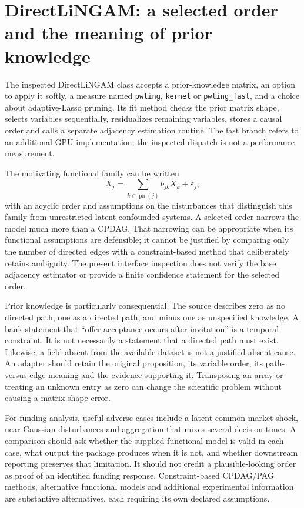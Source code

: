 \section{DirectLiNGAM: a selected order and the meaning of prior knowledge}

The inspected DirectLiNGAM class accepts a prior-knowledge matrix, an option to
apply it softly, a measure named \texttt{pwling}, \texttt{kernel} or
\texttt{pwling\_fast}, and a choice about adaptive-Lasso pruning. Its fit method
checks the prior matrix shape, selects variables sequentially, residualizes
remaining variables, stores a causal order and calls a separate adjacency
estimation routine. The fast branch refers to an additional GPU implementation;
the inspected dispatch is not a performance measurement. \citep{v13_sw_lingam}

The motivating functional family can be written
\[
 X_j=\sum_{k\in\operatorname{pa}(j)}b_{jk}X_k+\varepsilon_j,
\]
with an acyclic order and assumptions on the disturbances that distinguish this
family from unrestricted latent-confounded systems. A selected order narrows the
model much more than a CPDAG. That narrowing can be appropriate when its
functional assumptions are defensible; it cannot be justified by comparing only
the number of directed edges with a constraint-based method that deliberately
retains ambiguity. The present interface inspection does not verify the base
adjacency estimator or provide a finite confidence statement for the selected
order.

Prior knowledge is particularly consequential. The source describes zero as no
directed path, one as a directed path, and minus one as unspecified knowledge.
A bank statement that ``offer acceptance occurs after invitation'' is a temporal
constraint. It is not necessarily a statement that a directed path must exist.
Likewise, a field absent from the available dataset is not a justified absent
cause. An adapter should retain the original proposition, its variable order,
its path-versus-edge meaning and the evidence supporting it. Transposing an
array or treating an unknown entry as zero can change the scientific problem
without causing a matrix-shape error.

For funding analysis, useful adverse cases include a latent common market shock,
near-Gaussian disturbances and aggregation that mixes several decision times.
A comparison should ask whether the supplied functional model is valid in each
case, what output the package produces when it is not, and whether downstream
reporting preserves that limitation. It should not credit a plausible-looking
order as proof of an identified funding response. Constraint-based CPDAG/PAG
methods, alternative functional models and additional experimental information
are substantive alternatives, each requiring its own declared assumptions.

